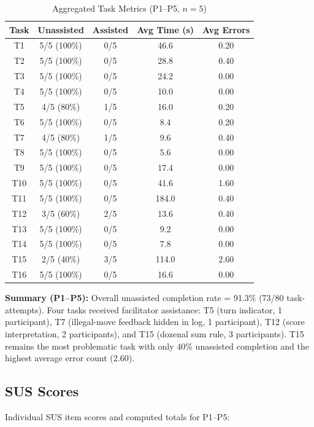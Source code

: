 \documentclass[12pt, titlepage]{article}
\begin{document}
\begin{table}[H]
\centering
\caption{Aggregated Task Metrics (P1--P5, $n=5$)}
\label{tab:agg-tasks}
\begin{tabular}{c c c c c}
\toprule
\textbf{Task} & \textbf{Unassisted} & \textbf{Assisted} & \textbf{Avg Time (s)} & \textbf{Avg Errors} \\
\midrule
T1  & 5/5 (100\%) & 0/5 & 46.6  & 0.20 \\
T2  & 5/5 (100\%) & 0/5 & 28.8  & 0.40 \\
T3  & 5/5 (100\%) & 0/5 & 24.2  & 0.00 \\
T4  & 5/5 (100\%) & 0/5 & 10.0  & 0.00 \\
T5  & 4/5 (80\%)  & 1/5 & 16.0  & 0.20 \\
T6  & 5/5 (100\%) & 0/5 & 8.4   & 0.20 \\
T7  & 4/5 (80\%)  & 1/5 & 9.6   & 0.40 \\
T8  & 5/5 (100\%) & 0/5 & 5.6   & 0.00 \\
T9  & 5/5 (100\%) & 0/5 & 17.4  & 0.00 \\
T10 & 5/5 (100\%) & 0/5 & 41.6  & 1.60 \\
T11 & 5/5 (100\%) & 0/5 & 184.0 & 0.40 \\
T12 & 3/5 (60\%)  & 2/5 & 13.6  & 0.40 \\
T13 & 5/5 (100\%) & 0/5 & 9.2   & 0.00 \\
T14 & 5/5 (100\%) & 0/5 & 7.8   & 0.00 \\
T15 & 2/5 (40\%)  & 3/5 & 114.0 & 2.60 \\
T16 & 5/5 (100\%) & 0/5 & 16.6  & 0.00 \\
\bottomrule
\end{tabular}
\end{table}

\noindent \textbf{Summary (P1--P5):} Overall unassisted completion rate = 91.3\% (73/80 task-attempts). Four tasks received facilitator assistance: T5 (turn indicator, 1 participant), T7 (illegal-move feedback hidden in log, 1 participant), T12 (score interpretation, 2 participants), and T15 (dozenal sum rule, 3 participants). T15 remains the most problematic task with only 40\% unassisted completion and the highest average error count (2.60).

\subsection{SUS Scores}

Individual SUS item scores and computed totals for P1--P5:
\end{document}
